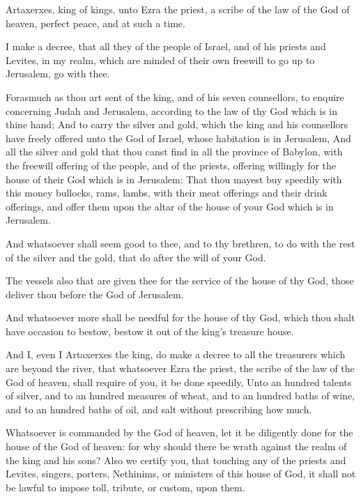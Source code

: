 \verse Artaxerxes, king of kings, unto Ezra the priest, a scribe of the law of the God of heaven, perfect peace, and at such a time.

\verse I make a decree, that all they of the people of Israel, and of his priests and Levites, in my realm, which are minded of their own freewill to go up to Jerusalem, go with thee.

\verse Forasmuch as thou art sent of the king, and of his seven counsellors, to enquire concerning Judah and Jerusalem, according to the law of thy God which is in thine hand; \verse And to carry the silver and gold, which the king and his counsellors have freely offered unto the God of Israel, whose habitation is in Jerusalem, \verse And all the silver and gold that thou canst find in all the province of Babylon, with the freewill offering of the people, and of the priests, offering willingly for the house of their God which is in Jerusalem: \verse That thou mayest buy speedily with this money bullocks, rams, lambs, with their meat offerings and their drink offerings, and offer them upon the altar of the house of your God which is in Jerusalem.

\verse And whatsoever shall seem good to thee, and to thy brethren, to do with the rest of the silver and the gold, that do after the will of your God.

\verse The vessels also that are given thee for the service of the house of thy God, those deliver thou before the God of Jerusalem.

\verse And whatsoever more shall be needful for the house of thy God, which thou shalt have occasion to bestow, bestow it out of the king's treasure house.

\verse And I, even I Artaxerxes the king, do make a decree to all the treasurers which are beyond the river, that whatsoever Ezra the priest, the scribe of the law of the God of heaven, shall require of you, it be done speedily, \verse Unto an hundred talents of silver, and to an hundred measures of wheat, and to an hundred baths of wine, and to an hundred baths of oil, and salt without prescribing how much.

\verse Whatsoever is commanded by the God of heaven, let it be diligently done for the house of the God of heaven: for why should there be wrath against the realm of the king and his sons?  \verse Also we certify you, that touching any of the priests and Levites, singers, porters, Nethinims, or ministers of this house of God, it shall not be lawful to impose toll, tribute, or custom, upon them.

